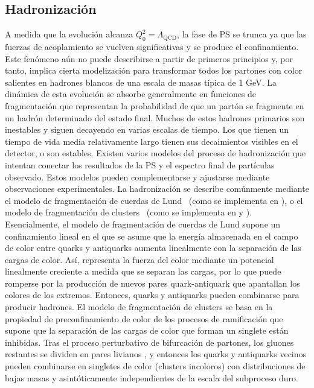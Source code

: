 \subsection{Hadronización}
\label{subsec:theory:mc_simulation:hadronisation}

A medida que la evolución alcanza \(Q^2_0 = \Lambda_{\text{QCD}} \), la fase de \ac{PS} se trunca ya que las fuerzas de acoplamiento se vuelven significativas y se produce el confinamiento. Este fenómeno aún no puede describirse a partir de primeros principios y, por tanto, implica cierta modelización para transformar todos los partones con color salientes en hadrones blancos de una escala de masas típica de 1 GeV. La dinámica de esta evolución se absorbe generalmente en funciones de fragmentación que representan la probabilidad de que un partón se fragmente en un hadrón determinado del estado final. Muchos de estos hadrones primarios son inestables y siguen decayendo en varias escalas de tiempo. Los que tienen un tiempo de vida media relativamente largo tienen sus decaimientos visibles en el detector, o son estables. Existen varios modelos del proceso de hadronización que intentan conectar los resultados de la \ac{PS} y el espectro final de partículas observado. Estos modelos pueden complementarse y ajustarse mediante observaciones experimentales. La hadronización se describe comúnmente mediante el modelo de fragmentación de cuerdas de Lund~\cite{Anderson-1983} (como se implementa en \Pythia), o el modelo de fragmentación de clusters~\cite{Webber-1984} (como se implementa en \Herwig y \Sherpa). Esencialmente, el modelo de fragmentación de cuerdas de Lund supone un confinamiento lineal en el que se asume que la energía almacenada en el campo de color entre quarks y antiquarks aumenta linealmente con la separación de las cargas de color. Así, representa la fuerza del color mediante un potencial linealmente creciente a medida que se separan las cargas, por lo que puede romperse por la producción de nuevos pares quark-antiquark que apantallan los colores de los extremos. Entonces, quarks y antiquarks pueden combinarse para producir hadrones. El modelo de fragmentación de clusters se basa en la propiedad de preconfinamiento de color de los procesos de ramificación que supone que la separación de las cargas de color que forman un singlete están inhibidas. Tras el proceso perturbativo de bifurcación de partones, los gluones restantes se dividen en pares livianos \qqbar, y entonces los quarks y antiquarks vecinos pueden combinarse en singletes de color (clusters incoloros) con distribuciones de bajas masas y asintóticamente independientes de la escala del subproceso duro.


